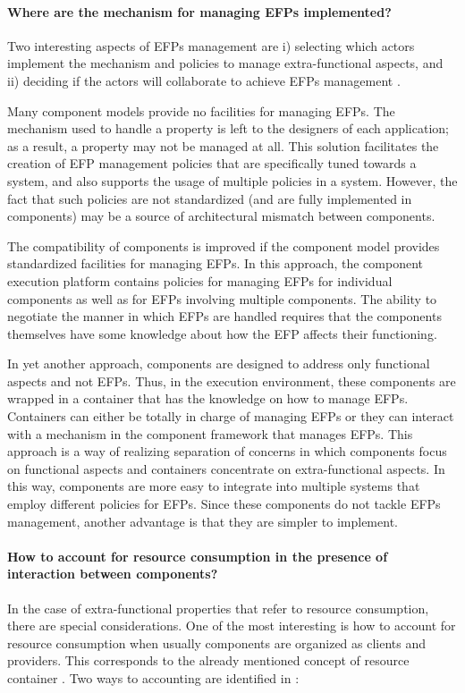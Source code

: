 \paragraph{Where are the mechanism for managing EFPs implemented?}
Two interesting aspects of EFPs management are i) selecting which actors implement the mechanism and policies to manage extra-functional aspects, and ii) deciding if the actors will collaborate to achieve EFPs management \cite{Crnkovic2011}.

Many component models provide no facilities for managing EFPs.
The mechanism used to handle a property is left to the designers of each application; as a result, a
property may not be managed at all.
This solution facilitates the creation of EFP management policies that are specifically tuned towards a system, and also supports the usage of multiple policies in a system.
However, the fact that such policies are not
standardized (and are fully implemented in components) may be a source of architectural mismatch between
components.

The compatibility of components is improved if the
component model provides standardized facilities for managing EFPs.
In this approach, the component execution platform contains
policies for managing EFPs for individual components as well as for EFPs involving multiple components.
The ability to negotiate the manner in which EFPs are handled requires that the
components themselves have some knowledge about how the EFP affects their functioning.

In yet another approach, components are designed to address only functional aspects and not EFPs.
Thus, in the execution environment, these components
are wrapped in a container that has the knowledge on how to manage EFPs.
Containers can either be totally in charge of managing EFPs or
they can interact with a mechanism in the component framework that manages EFPs.
This approach is a way of realizing separation of
concerns in which components focus on functional aspects
and containers concentrate on extra-functional aspects.
In this way, components are more easy to integrate into multiple systems that employ different policies for EFPs.
Since these components do not tackle EFPs management, another advantage is that they are simpler to implement.

\paragraph{How to account for resource consumption in the presence of interaction between components?}
In the case of extra-functional properties that refer to resource consumption, there are special considerations.
One of the most interesting is how to account for resource consumption when usually components are organized as clients and providers.
This corresponds to the already mentioned concept of resource container \cite{Banga:1999:RCN:296806.296810}.
Two ways to accounting are identified in \cite{Miettinen2008,Maurel:2012:AME:2304736.2304763}:

